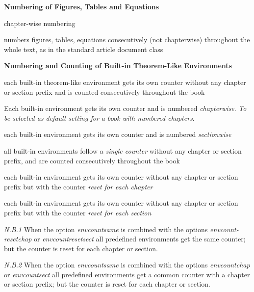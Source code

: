 \documentclass[graybox,square]{svmono}
\begin{document}
\begin{sloppy}

\textbf{Numbering of Figures, Tables and Equations}
\begin{description}
\item[{\it default}] chapter-wise numbering
\item[{\it numart}] numbers figures, tables, equations consecutively (not chapterwise) throughout the whole text, as in the standard article document class
\end{description}

\textbf{Numbering and Counting of Built-in Theorem-Like Environments}

\begin{description}
\item[\textit{default}] each built-in theorem-like environment gets its own
counter without any chapter or section prefix and is counted consecutively throughout the book
\item[\textit{envcountchap}] Each built-in environment gets its own counter and
is numbered \textit{chapterwise}. \textit{To be selected as default
setting for a book with numbered chapters}.
\item[\textit{envcountsect}] each built-in environment gets its own counter and
is numbered \textit{sectionwise}
\item[\textit{envcountsame}] all built-in environments follow a \textit{single counter}
without any chapter or section prefix, and are
counted consecutively throughout the book
\item[\textit{envcountresetchap}] each built-in environment gets its own counter without any chapter or section prefix but with the counter
\textit{reset for each chapter}
\item[\textit{envcountresetsect}] each built-in environment gets its own counter without any chapter or section prefix but with the counter
\textit{reset for each section}
\end{description}


\textit{N.B.1} When the option \textit{envcountsame} is combined with the options \textit{envcount-resetchap} or \textit{envcountresetsect} all predefined  environments get the same
counter; but the counter is reset for each chapter or section.


\textit{N.B.2} When the option \textit{envcountsame} is combined with the options \textit{envcountchap}
or \textit{envcountsect} all predefined environments get a common counter with
a chapter or section prefix; but the counter is reset for each chapter or section.



\end{sloppy}
\end{document}
